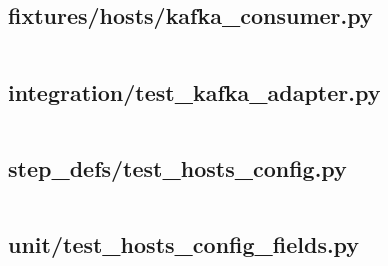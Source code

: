 \documentclass[10pt , a4paper]{report}
\newenvironment{code}{\captionsetup{type=listing}}{}
\begin{document}
\subsection{fixtures/hosts/kafka\_consumer.py}
\begin{code}
  \inputminted[fontsize=\small]{Python}{../tests/fixtures/kafka_consumer.py}
\end{code}

\subsection{integration/test\_kafka\_adapter.py}
\begin{code}
  \inputminted[fontsize=\small]{Python}{../tests/integration/test_kafka_adapter.py}
\end{code}

\subsection{step\_defs/test\_hosts\_config.py}
\begin{code}
  \inputminted[fontsize=\small]{Python}{../tests/step_defs/test_hosts_config.py}
\end{code}

\subsection{unit/test\_hosts\_config\_fields.py}
\begin{code}
  \inputminted[fontsize=\small]{Python}{../tests/unit/test_hosts_config_fields.py}
\end{code}
\end{document}
